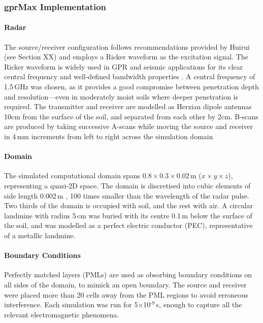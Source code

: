    
    
    \subsubsection{gprMax Implementation}

        \paragraph{Radar}
        
             The source/receiver configuration follows recommendations provided by Huirui (see Section XX) and employs a Ricker waveform as the excitation signal. The Ricker waveform is widely used in GPR and seismic applications for its clear central frequency and well‐defined bandwidth properties \cite{dummyRef2}. A central frequency of 1.5\,GHz was chosen, as it provides a good compromise between penetration depth and resolution—even in moderately moist soils where deeper penetration is required. The transmitter and receiver are modelled as Herzian dipole antennas 10cm from the surface of the soil, and separated from each other by 2cm. B-scans are produced by taking successive A-scans while moving the source and receiver in 4\,mm increments from left to right across the simulation domain
    
        \paragraph{Domain}

            The simulated computational domain spans $0.8\times 0.3\times0.02$\,m ($x\times y\times z$), representing a quasi-2D space. The domain is discretised into cubic elements of side length 0.002\,m , 100 times smaller than the wavelength of the radar pulse. Two thirds of the domain is occupied with soil, and the rest with air. A circular landmine with radius 5\,cm was buried with its centre 0.1\,m below the surface of the soil, and was modelled as a perfect electric conductor (PEC), representative of a metallic landmine.


        \paragraph{Boundary Conditions}
        
            Perfectly matched layers (PMLs) are used as obsorbing boundary conditions on all sides of the domain, to mimick an open boundary. The source and receiver were placed more than 20 cells away from the PML regions to avoid erroneous interference. Each simulation was run for 5$\times$10$^{\text{-9}}$\,s, enough to capture all the relevant electromagnetic phenomena.

